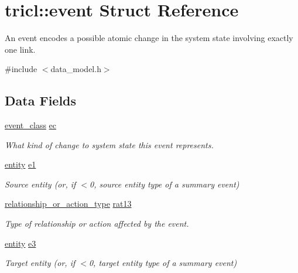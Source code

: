 \hypertarget{structtricl_1_1event}{}\section{tricl\+:\+:event Struct Reference}
\label{structtricl_1_1event}


An event encodes a possible atomic change in the system state involving exactly one link.  




{\ttfamily \#include $<$data\+\_\+model.\+h$>$}

\subsection*{Data Fields}
\begin{DoxyCompactItemize}
\item 
\mbox{\label{structtricl_1_1event_ab77115c2d4aada8d5c4f51dd6abcaa2a}} 
\hyperlink{namespacetricl_a6967089e2c0837f273d8cb5fd9f7e46d}{event\+\_\+class} \hyperlink{structtricl_1_1event_ab77115c2d4aada8d5c4f51dd6abcaa2a}{ec}
\begin{DoxyCompactList}\small\item\em What kind of change to system state this event represents. \end{DoxyCompactList}\item 
\mbox{\label{structtricl_1_1event_ae3de57643cd0d42762c1fcbd86bd2632}} 
\hyperlink{namespacetricl_a57273122278e8b301844e2a2e1f0742f}{entity} \hyperlink{structtricl_1_1event_ae3de57643cd0d42762c1fcbd86bd2632}{e1}
\begin{DoxyCompactList}\small\item\em Source entity (or, if $<$0, source entity type of a summary event) \end{DoxyCompactList}\item 
\mbox{\label{structtricl_1_1event_a57d8ec5cf582b4cd2de127590d805325}} 
\hyperlink{namespacetricl_a2d01894944fb58a8fedc0912a48d13f8}{relationship\+\_\+or\+\_\+action\+\_\+type} \hyperlink{structtricl_1_1event_a57d8ec5cf582b4cd2de127590d805325}{rat13}
\begin{DoxyCompactList}\small\item\em Type of relationship or action affected by the event. \end{DoxyCompactList}\item 
\mbox{\label{structtricl_1_1event_a49b653bfd4b01a1b561849e8aeadb53d}} 
\hyperlink{namespacetricl_a57273122278e8b301844e2a2e1f0742f}{entity} \hyperlink{structtricl_1_1event_a49b653bfd4b01a1b561849e8aeadb53d}{e3}
\begin{DoxyCompactList}\small\item\em Target entity (or, if $<$0, target entity type of a summary event) \end{DoxyCompactList}\end{DoxyCompactItemize}
